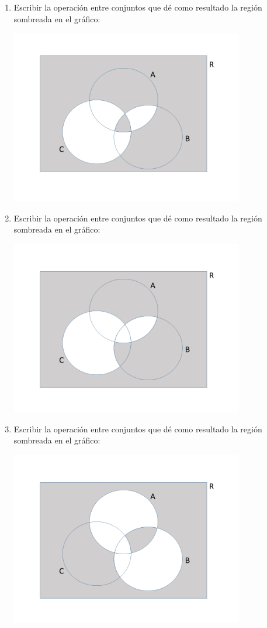 \documentclass[12pt]{article}
\begin{document}
\begin{enumerate}
\item  
Escribir la operación entre conjuntos que dé como resultado la  región sombreada en el gráfico:
\begin{center} 
\includegraphics[width= 0.8\textwidth]{ej1_6.png} 
\end{center}

\item  
Escribir la operación entre conjuntos que dé como resultado la  región sombreada en el gráfico:
\begin{center} 
\includegraphics[width= 0.8\textwidth]{ej1_7.png} 
\end{center}

\item  
Escribir la operación entre conjuntos que dé como resultado la  región sombreada en el gráfico:
\begin{center} 
\includegraphics[width= 0.8\textwidth]{ej1_8.png} 
\end{center}


\end{enumerate}
\end{document}
